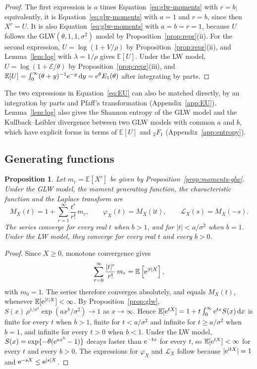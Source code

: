 \documentclass[12pt]{article}
\newcommand{\E}{\mathbb{E}}       %
\newcommand{\e}{{\rm e}}         %
\newcommand{\dd}{{\rm d}}        %
\newcommand{\Exp}{\mathcal{E}}   %
\newtheorem{proposition}{Proposition}
\begin{document}
\begin{proof}
The first expression is $a$ times Equation~\eqref{eq:glw-moments} with $r=b$; equivalently, it is Equation~\eqref{eq:glw-moments} with $a=1$ and $r=b$, since then $X^r=U$. It is also Equation~\eqref{eq:glw-moments} with $a=b=r=1$, because $U$ follows the GLW$(\theta,1,1,\sigma^2)$ model by Proposition~\ref{prop:repr}(ii). For the second expression, $U=\log(1+V/\rho)$ by Proposition~\ref{prop:repr}(ii), and Lemma~\ref{lem:log} with $\lambda=1/\rho$ gives $\E[U]$. Under the LW model, $U=\log(1+\Exp/\theta)$ by Proposition~\ref{prop:repr}(iii), and $\E[U]=\int_0^\infty(\theta+y)^{-1}\e^{-y}\,\dd y=\e^\theta E_1(\theta)$ after integrating by parts.
\end{proof}

The two expressions in Equation~\eqref{eq:EU} can also be matched directly, by an integration by parts and Pfaff's transformation (Appendix~\ref{app:EU}). Lemma~\ref{lem:log} also gives the Shannon entropy of the GLW model and the Kullback--Leibler divergence between two GLW models with common $a$ and $b$, which have explicit forms in terms of $\E[U]$ and ${}_2F_1$ (Appendix~\ref{app:entropy}).

\subsection{Generating functions}

\begin{proposition}\label{prop:mgf}
Let $m_r=\E[X^r]$ be given by Proposition~\ref{prop:moments-glw}. Under the GLW model, the moment generating function, the characteristic function and the Laplace transform are
\[
M_X(t)=1+\sum_{r=1}^{\infty}\frac{t^r}{r!}\,m_r,
\qquad
\varphi_X(t)=M_X(\mathrm{i}t),
\qquad
\mathcal{L}_X(s)=M_X(-s).
\]
The series converge for every real $t$ when $b>1$, and for $|t|<a/\sigma^2$ when $b=1$. Under the LW model, they converge for every real $t$ and every $b>0$.
\end{proposition}

\begin{proof}
Since $X\geq0$, monotone convergence gives
\[
\sum_{r=0}^{\infty}\frac{|t|^r}{r!}\,m_r=\E\left[\e^{|t|X}\right],
\]
with $m_0=1$. The series therefore converges absolutely, and equals $M_X(t)$, whenever $\E[\e^{|t|X}]<\infty$. By Proposition~\ref{prop:glw}, $S(x)\,\rho^{1/\sigma^2}\exp(ax^b/\sigma^2)\to1$ as $x\to\infty$. Hence $\E[\e^{tX}]=1+t\int_0^\infty\e^{tx}S(x)\,\dd x$ is finite for every $t$ when $b>1$, finite for $t<a/\sigma^2$ and infinite for $t\geq a/\sigma^2$ when $b=1$, and infinite for every $t>0$ when $b<1$. Under the LW model, $S(x)=\exp\{-\theta(\e^{ax^b}-1)\}$ decays faster than $\e^{-tx}$ for every $t$, so $\E[\e^{tX}]<\infty$ for every $t$ and every $b>0$. The expressions for $\varphi_X$ and $\mathcal{L}_X$ follow because $|\e^{\mathrm{i}tX}|=1$ and $\e^{-sX}\leq\e^{|s|X}$.
\end{proof}
\end{document}
